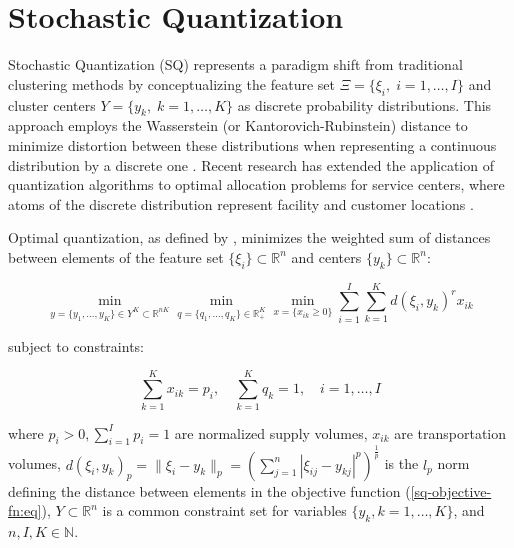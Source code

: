 \section{Stochastic Quantization}

Stochastic Quantization (SQ) represents a paradigm shift from traditional clustering methods by conceptualizing the feature set $\Xi = \{\xi_i, \;i = 1, \ldots, I\}$ and cluster centers $Y = \{y_k, \;k = 1, \ldots, K\}$ as discrete probability distributions. This approach employs the Wasserstein (or Kantorovich-Rubinstein) distance to minimize distortion between these distributions when representing a continuous distribution by a discrete one \cite{Kuzmenko_Uryasev_2019,Lakshmanan_Pichler_2023}. Recent research has extended the application of quantization algorithms to optimal allocation problems for service centers, where atoms of the discrete distribution represent facility and customer locations \cite{Kuzmenko_Uryasev_2019,Norkin_Onishchenko_2005}.

\begin{definition}
    \label{Stochastic Quantization}
    Optimal quantization, as defined by \cite{Kuzmenko_Uryasev_2019}, minimizes the weighted sum of distances between elements of the feature set $\{\xi_i\} \subset \mathbb{R}^{n}$ and centers $\{y_k\} \subset \mathbb{R}^{n}$:

    \begin{equation}
        \label{sq-objective-fn:eq}
        \min_{y = \{ y_1, \ldots, y_K \} \in Y^K \subset \mathbb{R}^{nK}} \min_{q = \{ q_1, \ldots, q_K \} \in \mathbb{R}^K_{+}} \min_{x = \{ x_{ik} \geq 0 \}} \sum_{i=1}^I \sum_{k=1}^K d(\xi_i, y_k)^r x_{ik}
    \end{equation}

    \noindent subject to constraints:

    \begin{equation}
        \label{sq-objective-constraints:eq}
        \sum_{k=1}^K x_{ik} = p_i, \quad \sum_{k=1}^K q_k = 1, \quad i = 1, \ldots, I
    \end{equation}

    \noindent where $p_i > 0, \sum_{i=1}^I p_i = 1$ are normalized supply volumes, $x_{ik}$ are transportation volumes, $d(\xi_i, y_k)_p = \| \xi_i - y_k \|_p = (\sum_{j=1}^n | \xi_{ij} - y_{kj} |^p)^{\frac{1}{p}}$ is the $l_p$ norm defining the distance between elements in the objective function (\ref{sq-objective-fn:eq}), $Y \subset \mathbb{R}^{n}$ is a common constraint set for variables $\{y_k, k = 1, \ldots, K\}$, and $n, I, K \in \mathbb{N}$.
\end{definition}

